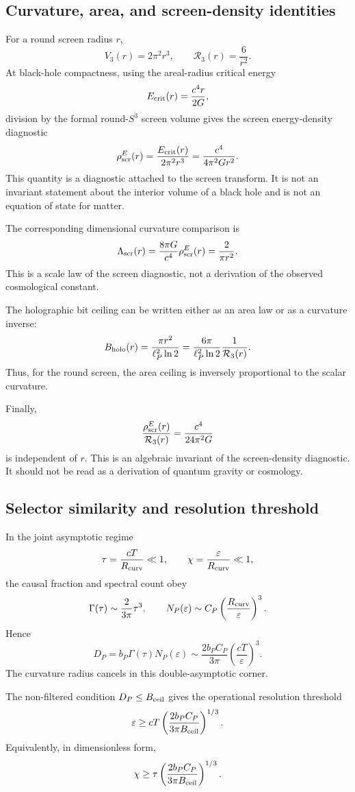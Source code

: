 \documentclass[11pt,a4paper]{article}
\begin{document}
\subsection{Curvature, area, and screen-density identities}

For a round screen radius \(r\),
\[
V_3(r)=2\pi^2r^3,
\qquad
\mathcal R_3(r)=\frac6{r^2}.
\]
At black-hole compactness, using the areal-radius critical energy
\[
E_{\rm crit}(r)=\frac{c^4r}{2G},
\]
division by the formal round-\(S^3\) screen volume gives the screen energy-density diagnostic
\[
\rho_{\rm scr}^{E}(r)
=
\frac{E_{\rm crit}(r)}{2\pi^2r^3}
=
\frac{c^4}{4\pi^2G r^2}.
\]
This quantity is a diagnostic attached to the screen transform.  It is not an invariant statement about the interior volume of a black hole and is not an equation of state for matter.

The corresponding dimensional curvature comparison is
\[
\Lambda_{\rm scr}(r)
=
\frac{8\pi G}{c^4}\rho_{\rm scr}^{E}(r)
=
\frac{2}{\pi r^2}.
\]
This is a scale law of the screen diagnostic, not a derivation of the observed cosmological constant.

The holographic bit ceiling can be written either as an area law or as a curvature inverse:
\[
B_{\rm holo}(r)
=
\frac{\pi r^2}{\ell_P^2\ln2}
=
\frac{6\pi}{\ell_P^2\ln2}\frac1{\mathcal R_3(r)}.
\]
Thus, for the round screen, the area ceiling is inversely proportional to the scalar curvature.

Finally,
\[
\frac{\rho_{\rm scr}^{E}(r)}{\mathcal R_3(r)}
=
\frac{c^4}{24\pi^2G}
\]
is independent of \(r\).  This is an algebraic invariant of the screen-density diagnostic.  It should not be read as a derivation of quantum gravity or cosmology.

\subsection{Selector similarity and resolution threshold}

In the joint asymptotic regime
\[
\tau=\frac{cT}{R_{\rm curv}}\ll1,
\qquad
\chi=\frac{\varepsilon}{R_{\rm curv}}\ll1,
\]
the causal fraction and spectral count obey
\[
\Gamma(\tau)\sim\frac{2}{3\pi}\tau^3,
\qquad
N_P(\varepsilon)\sim C_P\left(\frac{R_{\rm curv}}{\varepsilon}\right)^3.
\]
Hence
\[
D_P=b_P\Gamma(\tau)N_P(\varepsilon)
\sim
\frac{2b_PC_P}{3\pi}
\left(\frac{cT}{\varepsilon}\right)^3.
\]
The curvature radius cancels in this double-asymptotic corner.

The non-filtered condition \(D_P\le B_{\rm ceil}\) gives the operational resolution threshold
\[
\varepsilon
\ge
cT
\left(
\frac{2b_PC_P}{3\pi B_{\rm ceil}}
\right)^{1/3}.
\]
Equivalently, in dimensionless form,
\[
\chi
\ge
\tau
\left(
\frac{2b_PC_P}{3\pi B_{\rm ceil}}
\right)^{1/3}.
\]
\end{document}
